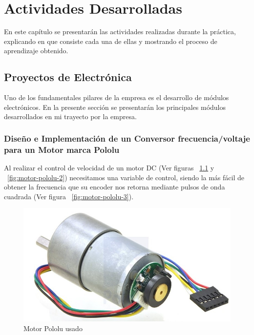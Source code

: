 \chapter{Actividades Desarrolladas}
En este capítulo se presentarán las actividades realizadas durante la práctica, explicando en que consiste cada una de ellas y mostrando el proceso de aprendizaje obtenido.


\section{Proyectos de Electrónica}

Uno de los fundamentales pilares de la empresa es el desarrollo de módulos electrónicos. En la presente sección se presentarán los principales módulos desarrollados en mi trayecto por la empresa.


\subsection{Diseño e Implementación de un Conversor frecuencia/voltaje para un Motor marca Pololu}

Al realizar el control de velocidad de un motor DC (Ver figuras ~\ref{fig:motor-pololu-1} y ~\ref{fig:motor-pololu-2}) necesitamos una variable de control, siendo la más fácil de obtener la frecuencia que su encoder nos retorna mediante pulsos de onda cuadrada (Ver figura ~\ref{fig:motor-pololu-3}).

\begin{figure}[h!]
  \centering
  \includegraphics[scale=0.3]{images/activities/motor_pololu/motor1.jpg}
  \caption{Motor Pololu usado}
  \label{fig:motor-pololu-1}
\end{figure}

